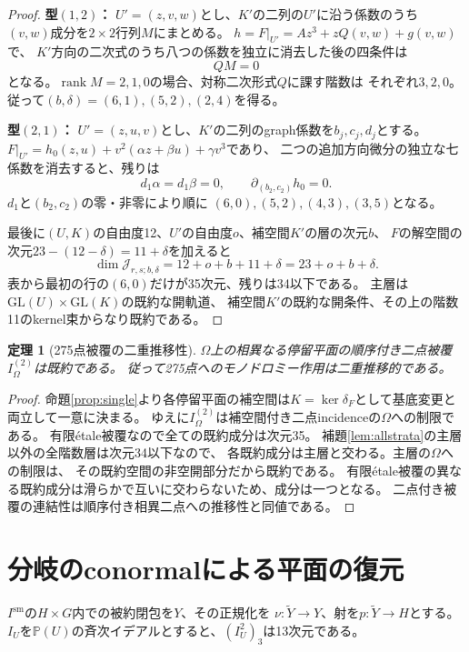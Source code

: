 \documentclass[11pt,a4paper]{ltjsarticle}
\newtheorem{theorem}{定理}[section]
\newcommand{\PP}{\mathbb P}
\newcommand{\rk}{\operatorname{rank}}
\newcommand{\GL}{\mathrm{GL}}
\begin{document}
\begin{proof}
\smallskip\noindent\textbf{型$(1,2)$：}
$U'=(z,v,w)$とし、$K'$の二列の$U'$に沿う係数のうち
$(v,w)$成分を$2\times2$行列$M$にまとめる。
$h=F|_{U'}=Az^3+zQ(v,w)+g(v,w)$で、
$K'$方向の二次式のうち八つの係数を独立に消去した後の四条件は
\begin{equation}\label{eq:r12}QM=0\end{equation}
となる。$\rk M=2,1,0$の場合、対称二次形式$Q$に課す階数は
それぞれ$3,2,0$。従って$(b,\delta)=(6,1),(5,2),(2,4)$を得る。

\smallskip\noindent\textbf{型$(2,1)$：}
$U'=(z,u,v)$とし、$K'$の二列のgraph係数を$b_j,c_j,d_j$とする。
$F|_{U'}=h_0(z,u)+v^2(\alpha z+\beta u)+\gamma v^3$であり、
二つの追加方向微分の独立な七係数を消去すると、残りは
\begin{equation}\label{eq:r21}
 d_1\alpha=d_1\beta=0,\qquad \partial_{(b_2,c_2)}h_0=0.
\end{equation}
$d_1$と$(b_2,c_2)$の零・非零により順に
$(6,0),(5,2),(4,3),(3,5)$となる。

\smallskip
最後に$(U,K)$の自由度12、$U'$の自由度$o$、補空間$K'$の層の次元$b$、
$F$の解空間の次元$23-(12-\delta)=11+\delta$を加えると
\[
 \dim\mathcal J_{r,s;b,\delta}=12+o+b+11+\delta=23+o+b+\delta.
\]
表から最初の行の$(6,0)$だけが35次元、残りは34以下である。
主層は$\GL(U)\times\GL(K)$の既約な開軌道、
補空間$K'$の既約な開条件、その上の階数11のkernel束からなり既約である。
\end{proof}

\begin{theorem}[275点被覆の二重推移性]\label{thm:double}
$\Omega$上の相異なる停留平面の順序付き二点被覆$I_\Omega^{(2)}$は既約である。
従って275点へのモノドロミー作用は二重推移的である。
\end{theorem}
\begin{proof}
命題\ref{prop:single}より各停留平面の補空間は$K=\ker\delta_F$として基底変更と両立して一意に決まる。
ゆえに$I_\Omega^{(2)}$は補空間付き二点incidenceの$\Omega$への制限である。
有限étale被覆なので全ての既約成分は次元35。
補題\ref{lem:allstrata}の主層以外の全階数層は次元34以下なので、
各既約成分は主層と交わる。主層の$\Omega$への制限は、
その既約空間の非空開部分だから既約である。
有限étale被覆の異なる既約成分は滑らかで互いに交わらないため、成分は一つとなる。
二点付き被覆の連結性は順序付き相異二点への推移性と同値である。
\end{proof}

\section{分岐のconormalによる平面の復元}\label{sec:conormal}
$I^{\mathrm{sm}}$の$H\times G$内での被約閉包を$Y$、その正規化を
$\nu:\widetilde Y\to Y$、射を$p:\widetilde Y\to H$とする。
$I_U$を$\PP(U)$の斉次イデアルとすると、$(I_U^2)_3$は13次元である。
\end{document}
